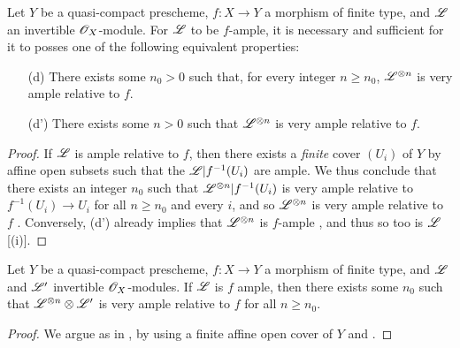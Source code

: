 \begin{proposition}[4.6.11]
\label{II.4.6.11}
Let $Y$ be a quasi-compact prescheme, $f:X\to Y$ a morphism of finite type, and $\mathscr{L}$ an invertible $\mathscr{O}_X$-module.
For $\mathscr{L}$ to be $f$-ample, it is necessary and sufficient for it to posses one of the following equivalent properties:
\begin{enumerate}
  \item[\rm{(d)}] There exists some $n_0>0$ such that, for every integer $n\geq n_0$, $\mathscr{L}^{\otimes n}$ is very ample relative to $f$.
  \item[\rm{(d')}] There exists some $n>0$ such that $\mathscr{L}^{\otimes n}$ is very ample relative to $f$.
\end{enumerate}
\end{proposition}

\begin{proof}
If $\mathscr{L}$ is ample relative to $f$, then there exists a \emph{finite} cover $(U_i)$ of $Y$ by affine open subsets such that the $\mathscr{L}|f^{-1}(U_i)$ are ample.
We thus conclude  that there exists an integer $n_0$ such that $\mathscr{L}^{\otimes n}|f^{-1}(U_i)$ is very ample relative to $f^{-1}(U_i)\to U_i$ for all $n\geq n_0$ and every $i$, and so $\mathscr{L}^{\otimes n}$ is very ample relative to $f$ .
Conversely, (d') already implies that $\mathscr{L}^{\otimes n}$ is $f$-ample , and thus so too is $\mathscr{L}$ [(i)].
\end{proof}

\begin{corollary}[4.6.12]
\label{II.4.6.12}
Let $Y$ be a quasi-compact prescheme, $f:X\to Y$ a morphism of finite type, and $\mathscr{L}$ and $\mathscr{L}'$ invertible $\mathscr{O}_X$-modules.
If $\mathscr{L}$ is $f$ ample, then there exists some $n_0$ such that $\mathscr{L}^{\otimes n}\otimes\mathscr{L}'$ is very ample relative to $f$ for all $n\geq n_0$.
\end{corollary}

\begin{proof}
We argue as in , by using a finite affine open cover of $Y$ and .
\end{proof}

